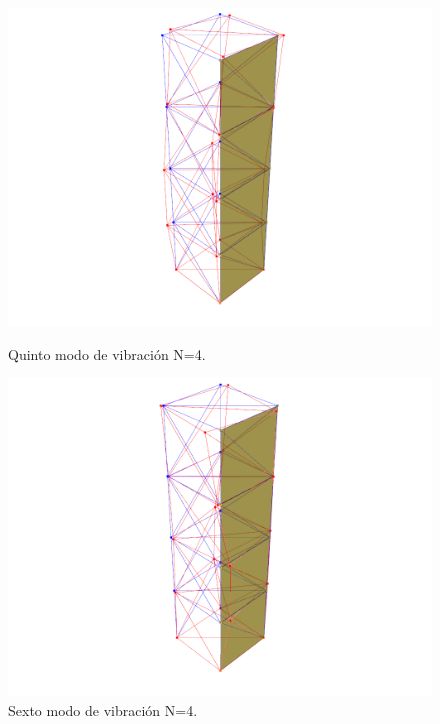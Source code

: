\begin{figure}[H]
    \begin{minipage}[b]{0.5\textwidth}
        \centering
        \includegraphics[width=\textwidth]{FOTOS/mod5_4.png}
        \caption{Quinto modo de vibración N=4.}
    \end{minipage}
    \hfill
    \begin{minipage}[b]{0.5\textwidth}
        \centering
        \includegraphics[width=\textwidth]{FOTOS/mod6_4.png}
        \caption{Sexto modo de vibración N=4.}
    \end{minipage}
\end{figure}


